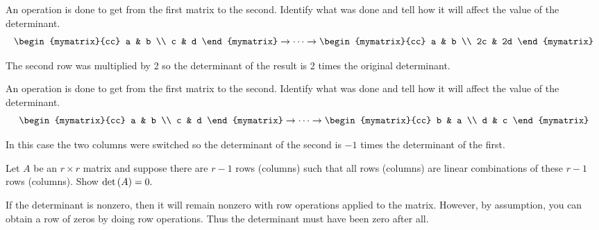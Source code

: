 \begin{enumialphparenastyle}
\begin{ex} An operation is done to get from the first matrix to the second.
Identify what was done and tell how it will affect the value of the
determinant. 
\begin{equation*}
\begin{mymatrix}{cc}
a & b \\
c & d
\end{mymatrix} \rightarrow \cdots \rightarrow \begin{mymatrix}{cc}
a & b \\
2c & 2d
\end{mymatrix}
\end{equation*}
\begin{sol}
The second row was multiplied by 2 so the determinant of the result is 2
times the original determinant.
\end{sol}
\end{ex}

\begin{ex} An operation is done to get from the first matrix to the second.
Identify what was done and tell how it will affect the value of the
determinant. 
\begin{equation*}
\begin{mymatrix}{cc}
a & b \\
c & d
\end{mymatrix} \rightarrow \cdots \rightarrow \begin{mymatrix}{cc}
b & a \\
d & c
\end{mymatrix}
\end{equation*}
\begin{sol}
In this case the two columns were switched so the determinant of the second
is $-1$ times the determinant of the first.
\end{sol}
\end{ex}


\begin{ex} Let $A$ be an $r\times r$ matrix and suppose there are $r-1$ rows
(columns) such that all rows (columns) are linear combinations of these $r-1$
rows (columns). Show $\det \left(A\right) =0.$ 
\begin{sol}
If the determinant is nonzero, then it will remain nonzero with row operations applied to the matrix.
However, by assumption, you can obtain a row of zeros by doing row
operations. Thus the determinant must have been zero after all.
\end{sol}
\end{ex}


\end{enumialphparenastyle}
